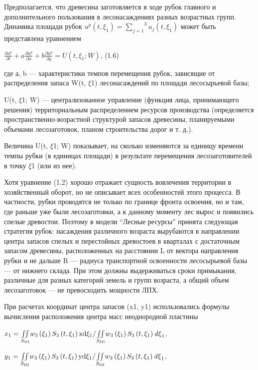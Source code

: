 \documentclass{report}
\newcommand\normalsubformula[1]{\text{\mathversion{normal}$#1$}}
\begin{document}
Предполагается, что древесина заготовляется в ходе рубок главного и дополнительного пользования в лесонасаждениях
раз\-ных возрастных групп. Динамика площади рубок  $u^p\left(t,\xi _1\right)=\overset 3{\underset{j=1}{\sum
}}u_j\left(t,\xi _1\right)$ может быть представлена уравнением 

 $\frac{\partial u^p}{\partial t}+a\frac{\partial u^p}{\partial x}+b\frac{\partial u^p}{\partial y}=U\left(t,\xi
_1;W\right)$,  (1.6)

где а, b — характеристики темпов перемещения рубок, зависящие от распределения запаса W(t, ${\xi}$1) лесонасаждений по
площади лесосырьевой базы;

U(t, ${\xi}$1; W) — централизованное управление (функция лица, принимающего решения) территориальным распределением
ресурсов производства (определяется пространственно-возрастной структурой запасов древесины, планируемыми объемами
лесозаготовок, планом строительства дорог и т. д.).

Величина U(t, ${\xi}$1; W) показывает, на сколько изменяются за единицу времени темпы рубки (в единицах площади) в
результате перемещения лесозаготовителей в точку ${\xi}$1 (или из нее).

Хотя уравнение (1.2) хорошо отражает сущность вовлечения территории в хозяйственный оборот, но не описывает всех
особен\-ностей этого процесса. В частности, рубки проводятся не только по границе фронта освоения, но и там, где раньше
уже были лесозаготовки, а к данному моменту лес вырос и появились спелые древостои. Поэтому в модели “Лесные ресурсы”
принята следующая стратегия рубок: насаждения различного возраста вырубаются в направлении центра запасов спелых и
перестойных древостоев в кварталах с достаточным запасом древесины, расположенных на расстоянии L от вектора
направления рубки и не дальше R — радиуса транспортной освоенности лесосырьевой базы — от нижнего склада. При этом
должны выдерживаться сроки примыкания, различные для разных категорий земель и групп возраста, а общий объем
лесозаготовок — не превосходить мощности ЛПХ.

При расчетах координат центра запасов (x1, y1) использовались формулы вычисления расположения центра масс неоднородной
пластины

 $x_1=\underset{S_{\text{III}}}{\iint }w_3\left(\xi _1\right)S_3\left(t,\xi _1\right)\normalsubformula{\text{xd}}\xi
_1/\underset{S_{\text{III}}}{\iint }w_3\left(\xi _1\right)S_3\left(t,\xi _1\right)\mathit{d\xi }_1$,

 $y_1=\underset{S_{\text{III}}}{\iint }w_3\left(\xi _1\right)S_3\left(t,\xi _1\right)\normalsubformula{\text{yd}}\xi
_1/\underset{S_{\text{III}}}{\iint }w_3\left(\xi _1\right)S_3\left(t,\xi _1\right)\mathit{d\xi }_1$,
\end{document}
